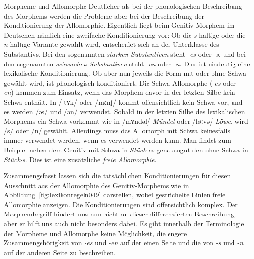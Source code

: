 \begin{Vertiefung}{Morpheme und Allomorphe}
Deutlicher als bei der phonologischen Beschreibung des Morphems werden die Probleme aber bei der Beschreibung der Konditionierung der Allomorphie.
Eigentlich liegt beim Genitiv-Morphem im Deutschen nämlich eine zweifache Konditionierung vor:
Ob die \textit{s}-haltige oder die \textit{n}-haltige Variante gewählt wird, entscheidet sich an der Unterklasse des Substantivs.
Bei den sogenannten \textit{starken Substantiven} steht \textit{-es} oder \textit{-s}, und bei den sogenannten \textit{schwachen Substantiven} steht \textit{-en} oder \textit{-n}.
Dies ist eindeutig eine lexikalische Konditionierung.
Ob aber nun jeweils die Form mit oder ohne Schwa gewählt wird, ist phonologisch konditioniert.
Die Schwa-Allomorphe (\textit{-es} oder \textit{-en}) kommen zum Einsatz, wenn das Morphem davor in der letzten Silbe kein Schwa enthält.
In /ʃtʏk/ oder /mɛnʃ/ kommt offensichtlich kein Schwa vor, und es werden /əs/ und /ən/ verwendet.
Sobald in der letzten Silbe des lexikalischen Morphems ein Schwa vorkommt wie in /mʏndəl/ \textit{Mündel} oder /løːvə/ \textit{Löwe}, wird /s/ oder /n/ gewählt.
Allerdings muss das Allomorph mit Schwa keinesfalls immer verwendet werden, wenn es verwendet werden kann.
Man findet zum Beispiel neben dem Genitiv mit Schwa in \textit{Stück-es} genausogut den ohne Schwa in \textit{Stück-s}.
Dies ist eine zusätzliche \textit{freie Allomorphie}.

Zusammengefasst lassen sich die tatsächlichen Konditionierungen für diesen Ausschnitt aus der Allomorphie des Genitiv-Morphems wie in Abbildung~\ref{fig:lexikonregeln049} darstellen, wobei gestrichelte Linien freie Allomorphie anzeigen.
Die Konditionierungen sind offensichtlich komplex.
Der Morphembegriff hindert uns nun nicht an dieser differenzierten Beschreibung, aber er hilft uns auch nicht besonders dabei.
Es gibt innerhalb der Terminologie der Morpheme und Allomorphe keine Möglichkeit, die engere Zusammengehörigkeit von \textit{-es} und \textit{-en} auf der einen Seite und die von \textit{-s} und \textit{-n} auf der anderen Seite zu beschreiben.

\begin{figure}[!htbp]
  \centering
\end{figure}
\end{Vertiefung}
